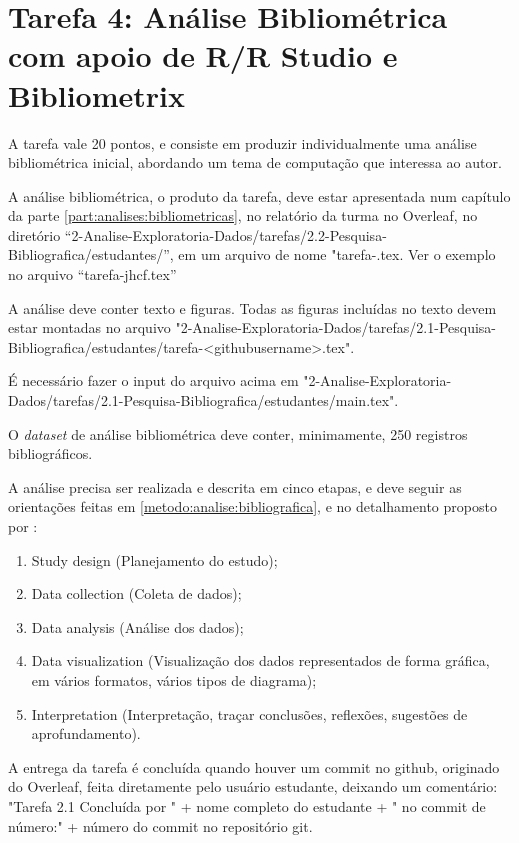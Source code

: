 \section{Tarefa 4: Análise Bibliométrica com apoio de R/R Studio e Bibliometrix}

A tarefa vale 20 pontos, e consiste em produzir individualmente uma análise bibliométrica inicial, abordando um tema de computação que  interessa ao autor. 

A análise bibliométrica, o produto da tarefa, deve estar apresentada num capítulo da parte \ref{part:analises:bibliometricas}, no relatório da turma no Overleaf, no diretório ``2-Analise-Exploratoria-Dados/tarefas/2.2-Pesquisa-Bibliografica/estudantes/'', em um arquivo de nome "tarefa-\githubusername.tex. Ver o exemplo no arquivo ``tarefa-jhcf.tex''

A análise deve conter texto e figuras. Todas as figuras incluídas no texto devem estar montadas no arquivo "2-Analise-Exploratoria-Dados/tarefas/2.1-Pesquisa-Bibliografica/estudantes/tarefa-<githubusername>.tex".

É necessário fazer o input do arquivo acima em "2-Analise-Exploratoria-Dados/tarefas/2.1-Pesquisa-Bibliografica/estudantes/main.tex".

O \textit{dataset} de análise bibliométrica deve conter, minimamente, 250 registros bibliográficos.

A análise precisa ser realizada e descrita em cinco etapas, e deve seguir as orientações feitas em \ref{metodo:analise:bibliografica}, e no detalhamento proposto por \citet{aria_bibliometrix_2017}:
\begin{enumerate}
    \item Study design (Planejamento do estudo);

    \item  Data collection (Coleta de dados);

    \item Data analysis (Análise dos dados);

    \item Data visualization (Visualização dos dados representados de forma gráfica, em vários formatos, vários tipos de diagrama);

    \item  Interpretation (Interpretação, traçar conclusões, reflexões, sugestões de aprofundamento).
\end{enumerate}


A entrega da tarefa é concluída quando houver um commit no github, originado do Overleaf, feita diretamente pelo usuário estudante, deixando um comentário: 
"Tarefa 2.1 Concluída por " + nome completo do estudante + " no commit de número:" + número do commit no repositório git.

